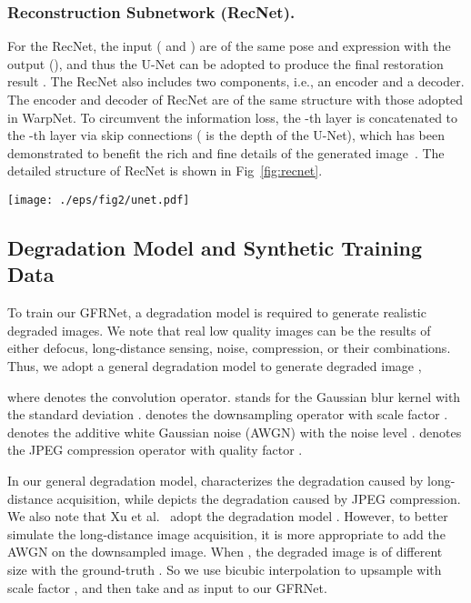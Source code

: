 \documentclass[runningheads]{llncs}
\begin{document}
\subsubsection{Reconstruction Subnetwork (RecNet).}

For the RecNet, the input ( and ) are of the same pose and expression with the output (), and thus the U-Net can be adopted to produce the final restoration result .
The RecNet also includes two components, i.e., an encoder and a decoder.
The encoder and decoder of RecNet are of the same structure with those adopted in WarpNet.
To circumvent the information loss, the -{th} layer is concatenated to the -{th} layer via skip connections ( is the depth of the U-Net), which has been demonstrated to benefit the rich and fine details of the generated image~\cite{pix2pix2016}. The detailed structure of RecNet is shown in Fig~\ref{fig:recnet}.
\begin{figure*}[htb]
\setlength{\abovecaptionskip}{-1ex}
\setlength{\belowcaptionskip}{-2ex}
\begin{center}
\texttt{[image: ./eps/fig2/unet.pdf]}
\end{center}
   \caption{Architecture of our RecNet. It takes  and  as input to produce the restoration result . Reconstruction loss and global adversarial loss are adopted across entire image (labeled in \textcolor[RGB]{112,48,160}{\textbf{purple}}), while local adversarial loss is adopted across face region (labeled in \textcolor[RGB]{0,176,80}{\textbf{green}}).}
   \label{fig:recnet}
\end{figure*}
\subsection{Degradation Model and Synthetic Training Data}
To train our GFRNet, a degradation model is required to generate realistic degraded images.
We note that real low quality images can be the results of either defocus, long-distance sensing, noise, compression, or their combinations.
Thus, we adopt a general degradation model to generate degraded image ,

where  denotes the convolution operator.
 stands for the Gaussian blur kernel with the standard deviation .
 denotes the downsampling operator with scale factor .
 denotes the additive white Gaussian noise (AWGN) with the noise level .
 denotes the JPEG compression operator with quality factor .


In our general degradation model,  characterizes the degradation caused by long-distance acquisition, while  depicts the degradation caused by JPEG compression.
We also note that Xu et al.~\cite{xu2017learning} adopt the degradation model  .
However, to better simulate the long-distance image acquisition, it is more appropriate to add the AWGN on the downsampled image.
When , the degraded image  is of different size with the ground-truth .
So we use bicubic interpolation to upsample  with scale factor , and then take  and  as input to our GFRNet.
\end{document}
